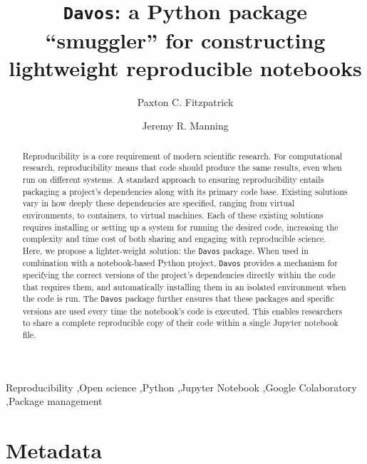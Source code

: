 \documentclass[preprint,12pt,a4paper]{elsarticle}
\begin{document}
\begin{frontmatter}

\title{\texttt{Davos}: a Python package ``smuggler'' for constructing
  lightweight reproducible notebooks}
\author{Paxton C. Fitzpatrick}
\author{Jeremy R. Manning}
\address{Department of Psychological and Brain Sciences\\Dartmouth College, Hanover, NH 03755}


\begin{abstract}
  Reproducibility is a core requirement of modern scientific research.
  For computational research, reproducibility means that code should
  produce the same results, even when run on different systems. A
  standard approach to ensuring reproducibility entails packaging a
  project's dependencies along with its primary code base. Existing
  solutions vary in how deeply these dependencies are specified,
  ranging from virtual environments, to containers, to virtual
  machines. Each of these existing solutions requires installing or
  setting up a system for running the desired code, increasing the
  complexity and time cost of both sharing and engaging with reproducible
  science. Here, we propose a lighter-weight solution: the
  \texttt{Davos} package. When used in combination with a
  notebook-based Python project, \texttt{Davos} provides a mechanism
  for specifying the correct versions of the project's
  dependencies directly within the code that requires them,
  and automatically installing them in an isolated environment
  when the code is run. The \texttt{Davos} package further
  ensures that these packages and specific versions are used every
  time the notebook's code is executed. This enables researchers to
  share a complete reproducible copy of their code within a single
  Jupyter notebook file.
\end{abstract}


\begin{keyword}
  Reproducibility \sep Open science \sep Python \sep Jupyter Notebook
  \sep Google Colaboratory \sep Package management
\end{keyword}

\end{frontmatter}


\section*{Metadata}
\end{document}
